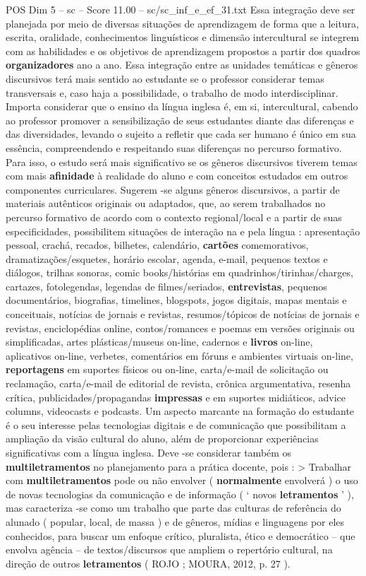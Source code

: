 \begin{textsample}{POS Dim 5 – sc – Score 11.00 – sc/sc\_inf\_e\_ef\_31.txt}
Essa integração deve ser planejada por meio de diversas situações de aprendizagem de forma que a leitura, escrita, oralidade, conhecimentos linguísticos e dimensão intercultural se integrem com as habilidades e os objetivos de aprendizagem propostos a partir dos quadros \textbf{organizadores} ano a ano.
Essa integração entre as unidades temáticas e gêneros discursivos terá mais sentido ao estudante se o professor considerar temas transversais e, caso haja a possibilidade, o trabalho de modo interdisciplinar.
Importa considerar que o ensino da língua inglesa é, em si, intercultural, cabendo ao professor promover a sensibilização de seus estudantes diante das diferenças e das diversidades, levando o sujeito a refletir que cada ser humano é único em sua essência, compreendendo e respeitando suas diferenças no percurso formativo.
Para isso, o estudo será mais significativo se os gêneros discursivos tiverem temas com mais \textbf{afinidade} à realidade do aluno e com conceitos estudados em outros componentes curriculares.
Sugerem -se alguns gêneros discursivos, a partir de materiais autênticos originais ou adaptados, que, ao serem trabalhados no percurso formativo de acordo com o contexto regional/local e a partir de suas especificidades, possibilitem situações de interação na e pela língua : apresentação pessoal, crachá, recados, bilhetes, calendário, \textbf{cartões} comemorativos, dramatizações/esquetes, horário escolar, agenda, e-mail, pequenos textos e diálogos, trilhas sonoras, comic books/histórias em quadrinhos/tirinhas/charges, cartazes, fotolegendas, legendas de filmes/seriados, \textbf{entrevistas}, pequenos documentários, biografias, timelines, blogspots, jogos digitais, mapas mentais e conceituais, notícias de jornais e revistas, resumos/tópicos de notícias de jornais e revistas, enciclopédias online, contos/romances e poemas em versões originais ou simplificadas, artes plásticas/museus on-line, cadernos e \textbf{livros} on-line, aplicativos on-line, verbetes, comentários em fóruns e ambientes virtuais on-line, \textbf{reportagens} em suportes físicos ou on-line, carta/e-mail de solicitação ou reclamação, carta/e-mail de editorial de revista, crônica argumentativa, resenha crítica, publicidades/propagandas \textbf{impressas} e em suportes midiáticos, advice columns, videocasts e podcasts.
Um aspecto marcante na formação do estudante é o seu interesse pelas tecnologias digitais e de comunicação que possibilitam a ampliação da visão cultural do aluno, além de proporcionar experiências significativas com a língua inglesa.
Deve -se considerar também os \textbf{multiletramentos} no planejamento para a prática docente, pois : > Trabalhar com \textbf{multiletramentos} pode ou não envolver ( \textbf{normalmente} envolverá ) o uso de novas tecnologias da comunicação e de informação ( ‘ novos \textbf{letramentos} ’ ), mas caracteriza -se como um trabalho que parte das culturas de referência do alunado ( popular, local, de massa ) e de gêneros, mídias e linguagens por eles conhecidos, para buscar um enfoque crítico, pluralista, ético e democrático – que envolva agência – de textos/discursos que ampliem o repertório cultural, na direção de outros \textbf{letramentos} ( ROJO ; MOURA, 2012, p. 27 ).

\end{textsample}
